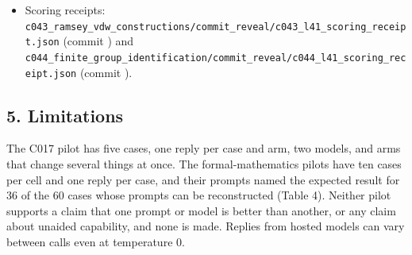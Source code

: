 \documentclass[
  11pt,
]{article}
\begin{document}
\begin{itemize}
  repository root): the collection's script
  \texttt{omega\_\allowbreak{}engine\_\allowbreak{}atlas/\allowbreak{}coda\_\allowbreak{}atlas/\allowbreak{}omega\_\allowbreak{}engine\_\allowbreak{}symbol\_\allowbreak{}game/\allowbreak{}tools/\allowbreak{}replay\_\allowbreak{}formal\_\allowbreak{}math\_\allowbreak{}baselines.py}
  and its record
  \texttt{omega\_\allowbreak{}engine\_\allowbreak{}atlas/\allowbreak{}coda\_\allowbreak{}atlas/\allowbreak{}omega\_\allowbreak{}engine\_\allowbreak{}symbol\_\allowbreak{}game/\allowbreak{}verification/\allowbreak{}formal\_\allowbreak{}math\_\allowbreak{}baselines.json}.
  It reads the runners and checkers from commits
  \texttt{} (the C045
  runner) and
  \texttt{} (C046 to
  C050). The C045 checkers are read from commit
  \texttt{}, which
  differs from the run commit in that folder only by one import line
  that Python 3.12 needs to load the exact checker.
\item
  Scoring receipts:
  \texttt{c043\_\allowbreak{}ramsey\_\allowbreak{}vdw\_\allowbreak{}constructions/\allowbreak{}commit\_\allowbreak{}reveal/\allowbreak{}c043\_\allowbreak{}l41\_\allowbreak{}scoring\_\allowbreak{}receipt.json}
  (commit \texttt{})
  and
  \texttt{c044\_\allowbreak{}finite\_\allowbreak{}group\_\allowbreak{}identification/\allowbreak{}commit\_\allowbreak{}reveal/\allowbreak{}c044\_\allowbreak{}l41\_\allowbreak{}scoring\_\allowbreak{}receipt.json}
  (commit \texttt{}).
\end{itemize}

\hypertarget{limitations}{%
\subsection{5. Limitations}\label{limitations}}

The C017 pilot has five cases, one reply per case and arm, two models,
and arms that change several things at once. The formal-mathematics
pilots have ten cases per cell and one reply per case, and their prompts
named the expected result for 36 of the 60 cases whose prompts can be
reconstructed (Table 4). Neither pilot supports a claim that one prompt
or model is better than another, or any claim about unaided capability,
and none is made. Replies from hosted models can vary between calls even
at temperature 0.
\end{document}
